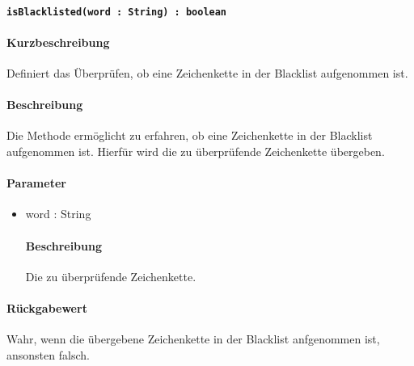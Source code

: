 \paragraph{\texttt{isBlacklisted(word : String) : boolean}}%
\paragraph*{Kurzbeschreibung}
Definiert das Überprüfen, ob eine Zeichenkette in der Blacklist aufgenommen ist.
\paragraph*{Beschreibung}
Die Methode ermöglicht zu erfahren, ob eine Zeichenkette in der Blacklist aufgenommen ist.
Hierfür wird die zu überprüfende Zeichenkette übergeben.
\paragraph*{Parameter}
\begin{itemize}
    \item word : String
    		\paragraph*{Beschreibung}
    		Die zu überprüfende Zeichenkette.
\end{itemize}
\paragraph*{Rückgabewert}
Wahr, wenn die übergebene Zeichenkette in der Blacklist anfgenommen ist, ansonsten falsch.
